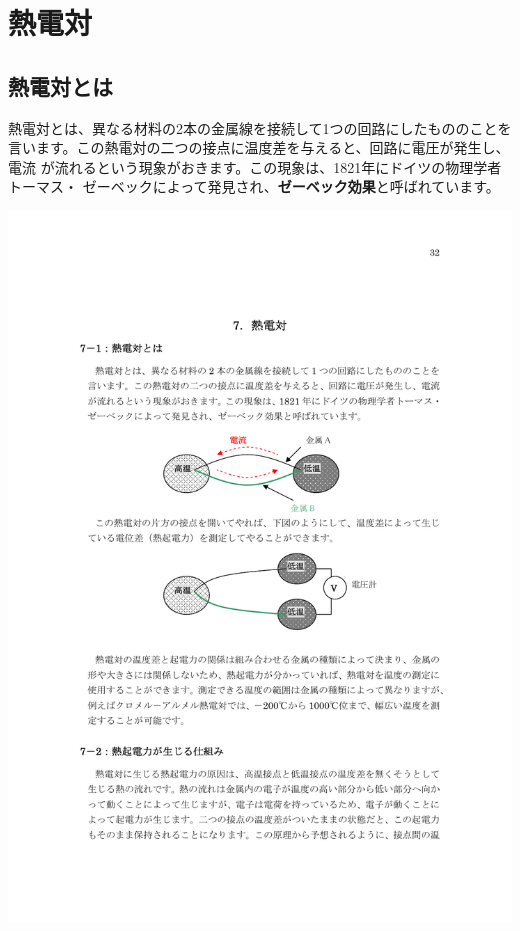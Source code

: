 %
%


\section{熱電対}

\subsection{熱電対とは}

熱電対とは、異なる材料の2本の金属線を接続して1つの回路にしたもののことを 
言います。この熱電対の二つの接点に温度差を与えると、回路に電圧が発生し、電流 
が流れるという現象がおきます。この現象は、1821年にドイツの物理学者トーマス・ 
ゼーベックによって発見され、{\bf ゼーベック効果}と呼ばれています。

\begin{center}
\includegraphics[bb=175 482 441 585]{10_Thermocouple/thermocouple1.pdf}
\end{center}

